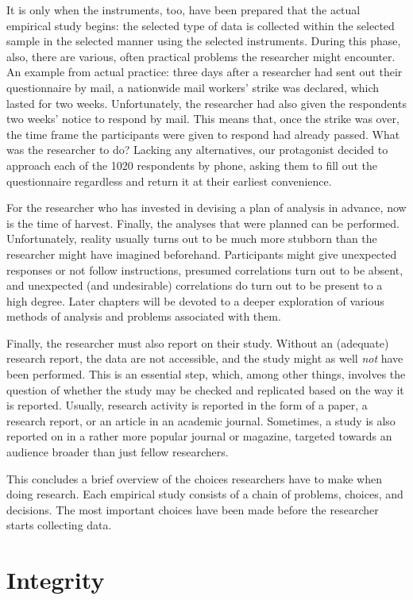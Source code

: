 \documentclass[
]{book}
\begin{document}
It is only when the instruments, too, have been prepared that the actual empirical study begins: the selected type of data is collected within the selected sample in the selected manner using the selected instruments. During this phase, also, there are various, often practical problems the researcher might encounter. An example from actual practice: three days after a researcher had sent out their questionnaire by mail, a nationwide mail workers' strike was declared, which lasted for two weeks. Unfortunately, the researcher had also given the respondents two weeks' notice to respond by mail. This means that, once the strike was over, the time frame the participants were given to respond had already passed. What was the researcher to do? Lacking any alternatives, our protagonist decided to approach each of the 1020 respondents by phone, asking them to fill out the questionnaire regardless and return it at their earliest convenience.

For the researcher who has invested in devising a plan of analysis in advance, now is the time of harvest. Finally, the analyses that were planned can be performed. Unfortunately, reality usually turns out to be much more stubborn than the researcher might have imagined beforehand. Participants might give unexpected responses or not follow instructions, presumed correlations turn out to be absent, and unexpected (and undesirable) correlations do turn out to be present to a high degree. Later chapters will be devoted to a deeper exploration of various methods of analysis and problems associated with them.

Finally, the researcher must also report on their study. Without an (adequate) research report, the data are not accessible, and the study might as well \emph{not} have been performed. This is an essential step, which, among other things, involves the question of whether the study may be checked and replicated based on the way it is reported. Usually, research activity is reported in the form of a paper, a research report, or an article in an academic journal. Sometimes, a study is also reported on in a rather more popular journal or magazine, targeted towards an audience broader than just fellow researchers.

This concludes a brief overview of the choices researchers have to make when doing research. Each empirical study consists of a chain of problems, choices, and decisions. The most important choices have been made before the researcher starts collecting data.

\hypertarget{ch-integrity}{%
\chapter{Integrity}\label{ch-integrity}}
\end{document}
